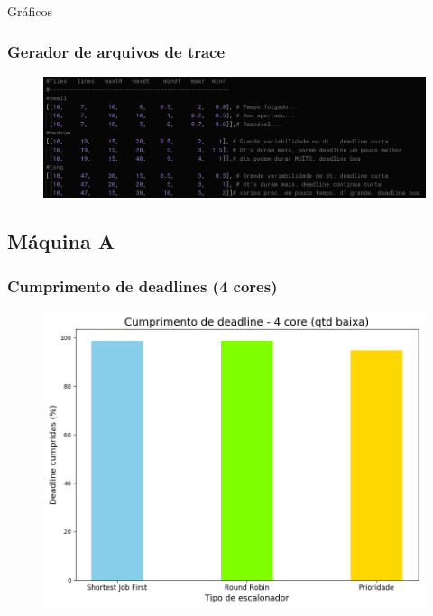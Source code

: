 \documentclass{beamer}
\begin{document}
\begin{frame}
\begin{center}
\huge Gráficos
\end{center}
\end{frame}

\begin{frame}
\frametitle{Gerador de arquivos de trace}
\begin{figure}
\includegraphics[scale=0.3]{trace_dist.png}
\end{figure}
\end{frame}


\subsection{Máquina A}

\begin{frame}
\frametitle{Cumprimento de deadlines (4 cores)}
\begin{figure}
\includegraphics[scale=0.4]{deadline_small_4.png}
\end{figure}
\end{frame}
\end{document}
